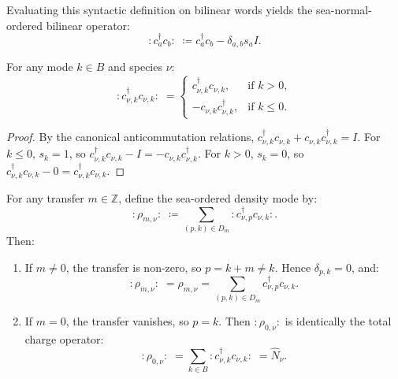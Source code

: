 Evaluating this syntactic definition on bilinear words yields the sea-normal-ordered bilinear operator:
\begin{equation}
:\! c_a^\dagger c_b \!: \;\coloneqq c_a^\dagger c_b - \delta_{a, b} s_a I.
\end{equation}

\begin{lemma}
\label{lem:app_sea_normal_bilinear_diag}
For any mode $k \in B$ and species $\nu$:
\begin{equation}
:\! c_{\nu, k}^\dagger c_{\nu, k} \!: \;= \begin{cases} c_{\nu, k}^\dagger c_{\nu, k}, & \text{if } k > 0, \\ - c_{\nu, k} c_{\nu, k}^\dagger, & \text{if } k \le 0. \end{cases}
\end{equation}
\end{lemma}

\begin{proof}
By the canonical anticommutation relations, $c_{\nu, k}^\dagger c_{\nu, k} + c_{\nu, k} c_{\nu, k}^\dagger = I$. For $k \le 0$, $s_k = 1$, so $c_{\nu, k}^\dagger c_{\nu, k} - I = -c_{\nu, k} c_{\nu, k}^\dagger$. For $k > 0$, $s_k = 0$, so $c_{\nu, k}^\dagger c_{\nu, k} - 0 = c_{\nu, k}^\dagger c_{\nu, k}$.
\end{proof}

\begin{lemma}
\label{lem:app_sea_normal_rho}
For any transfer $m \in \mathbb{Z}$, define the sea-ordered density mode by:
\begin{equation}
:\! \rho_{m, \nu} \!: \;\coloneqq \sum_{(p, k) \in D_m} :\! c_{\nu, p}^\dagger c_{\nu, k} \!:.
\end{equation}
Then:
\begin{enumerate}
    \item If $m \neq 0$, the transfer is non-zero, so $p = k + m \neq k$. Hence $\delta_{p, k} = 0$, and:
    \begin{equation}
    :\! \rho_{m, \nu} \!: \;= \rho_{m, \nu} = \sum_{(p, k) \in D_m} c_{\nu, p}^\dagger c_{\nu, k}.
    \end{equation}
    \item If $m = 0$, the transfer vanishes, so $p = k$. Then $:\! \rho_{0, \nu} \!:$ is identically the total charge operator:
    \begin{equation}
    :\! \rho_{0, \nu} \!: \;= \sum_{k \in B} :\! c_{\nu, k}^\dagger c_{\nu, k} \!: \;= \hat{N}_\nu.
    \end{equation}
\end{enumerate}
\end{lemma}

